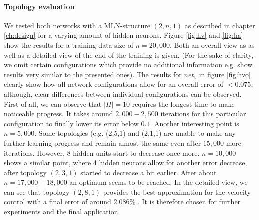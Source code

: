 \documentclass[10pt,a4paper,DIV=11]{scrreprt}
\begin{document}
\paragraph{Topology evaluation} We tested both networks with a MLN-structure $(2,n,1)$ as described in chapter \ref{ch:design} for a varying amount of hidden neurons.
Figure \ref{fig:hv} and \ref{fig:ha} show the results for a training data size of $n = 20,000$. Both an overall view as as well as a detailed view of the end of the training is given.
(For the sake of clarity, we omit certain configurations which provide no additional information e.g. show results very similar to the presented ones).
The results for $net_v$ in figure \ref{fig:hvo} clearly show how all network configurations allow for an overall error of $<0.075$, although, clear differences between individual 
configurations can be observed. First of all, we can observe that $|H| = 10$ requires the longest time to make noticeable progress. It takes around $2,000-2,500$ iterations for this 
particular configuration to finally lower its error below $0.1$. Another interesting point is $n=5,000$. Some topologies (e.g. (2,5,1) and (2,1,1) are unable to make any 
further learning progress and remain almost the same even after $15,000$ more iterations. However, 8 hidden units start to decrease once more. $n=10,000$ shows a similar point, where
4 hidden neurons allow for another error decrease, after topology $(2,3,1)$ started to decrease a bit earlier. After about $n=17,000-18,000$ an optimum seems to be reached. 
In the detailed view, we can see that topology $(2,8,1)$ provides the best approximation for the velocity control with a final error of around $2.086\%$ . 
It is therefore chosen for further experiments and the final application.
\end{document}
